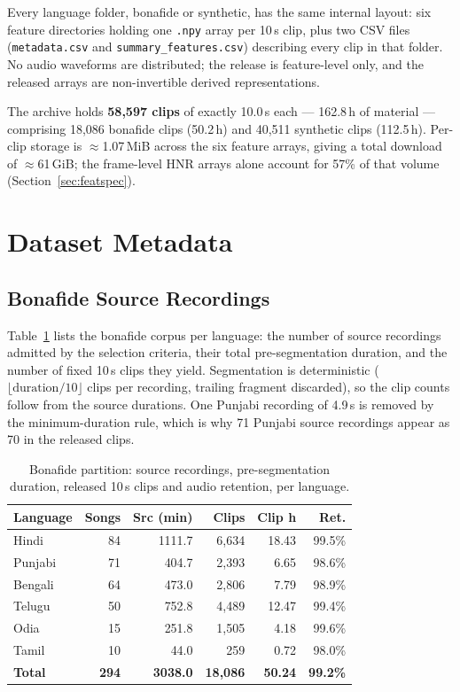 \documentclass[conference]{IEEEtran}
\begin{document}
Every language folder, bonafide or synthetic, has the same internal layout: six
feature directories holding one \texttt{.npy} array per 10\,s clip, plus two CSV files
(\texttt{metadata.csv} and \texttt{summary\_features.csv}) describing every clip in that
folder. No audio waveforms are distributed; the release is feature-level only, and the
released arrays are non-invertible derived representations.

The archive holds \textbf{58{,}597 clips} of exactly 10.0\,s each --- 162.8\,h of
material --- comprising 18{,}086 bonafide clips (50.2\,h) and 40{,}511 synthetic clips
(112.5\,h). Per-clip storage is $\approx$1.07\,MiB across the six feature arrays, giving
a total download of $\approx$61\,GiB; the frame-level HNR arrays alone account for 57\%
of that volume (Section~\ref{sec:featspec}).

\section{Dataset Metadata}

\subsection{Bonafide Source Recordings}
Table~\ref{tab:s1} lists the bonafide corpus per language: the number of source
recordings admitted by the selection criteria, their total pre-segmentation duration, and
the number of fixed 10\,s clips they yield. Segmentation is deterministic
($\lfloor \text{duration}/10 \rfloor$ clips per recording, trailing fragment discarded),
so the clip counts follow from the source durations. One Punjabi recording of 4.9\,s is
removed by the minimum-duration rule, which is why 71 Punjabi source recordings appear as
70 in the released clips.

\begin{table}[t]
\centering
\caption{Bonafide partition: source recordings, pre-segmentation duration, released
10\,s clips and audio retention, per language.}
\label{tab:s1}
\footnotesize
\setlength{\tabcolsep}{4pt}
\begin{tabular}{lrrrrr}
\toprule
\textbf{Language} & \textbf{Songs} & \textbf{Src (min)} & \textbf{Clips} & \textbf{Clip h} & \textbf{Ret.} \\
\midrule
Hindi   & 84  & 1111.7 & 6{,}634 & 18.43 & 99.5\% \\
Punjabi & 71  &  404.7 & 2{,}393 &  6.65 & 98.6\% \\
Bengali & 64  &  473.0 & 2{,}806 &  7.79 & 98.9\% \\
Telugu  & 50  &  752.8 & 4{,}489 & 12.47 & 99.4\% \\
Odia    & 15  &  251.8 & 1{,}505 &  4.18 & 99.6\% \\
Tamil   & 10  &   44.0 &    259 &  0.72 & 98.0\% \\
\midrule
\textbf{Total} & \textbf{294} & \textbf{3038.0} & \textbf{18{,}086} & \textbf{50.24} & \textbf{99.2\%} \\
\bottomrule
\end{tabular}
\end{table}
\end{document}
